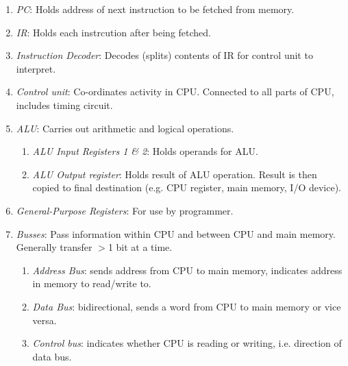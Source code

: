 \documentclass[twocolumn,english]{article}
\begin{document}
\begin{enumerate}
\item \emph{PC}: Holds address of next instruction to be fetched from memory.
\item \emph{IR}: Holds each instrcution after being fetched.
\item \emph{Instruction Decoder}: Decodes (splits) contents of IR for control
unit to interpret.
\item \emph{Control unit}: Co-ordinates activity in CPU. Connected to all
parts of CPU, includes timing circuit.
\item \emph{ALU}: Carries out arithmetic and logical operations.

\begin{enumerate}
\item \emph{ALU Input Registers 1 \& 2}: Holds operands for ALU.
\item \emph{ALU Output register}: Holds result of ALU operation. Result
is then copied to final destination (e.g. CPU register, main memory,
I/O device).
\end{enumerate}
\item \emph{General-Purpose Registers}: For use by programmer.
\item \emph{Busses}: Pass information within CPU and between CPU and main
memory. Generally transfer $>$1 bit at a time.

\begin{enumerate}
\item \emph{Address Bus}: sends address from CPU to main memory, indicates
address in memory to read/write to.
\item \emph{Data Bus}: bidirectional, sends a word from CPU to main memory
or vice versa.
\item \emph{Control bus}: indicates whether CPU is reading or writing, i.e.
direction of data bus.
\end{enumerate}
\end{enumerate}
\end{document}
